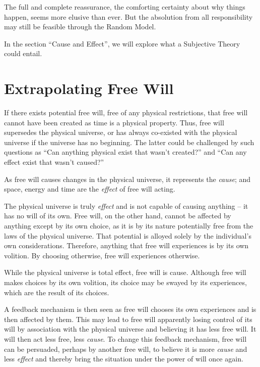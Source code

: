 \documentclass[11pt]{article}
\begin{document}
The full and complete reassurance, the comforting certainty about why things
happen, seems more elusive than ever. But the absolution from all responsibility
may still be feasible through the Random Model.

In the section ``Cause and Effect'', we will explore what a Subjective Theory
could entail.

\section{Extrapolating Free Will}

If there exists potential free will, free of any physical restrictions, that
free will cannot have been created as time is a physical property. Thus, free
will supersedes the physical universe, or has always co-existed with the
physical universe if the universe has no beginning. The latter could be
challenged by such questions as ``Can anything physical exist that wasn't
created?'' and ``Can any effect exist that wasn't caused?''

As free will causes changes in the physical universe, it represents the {\em
cause}; and space, energy and time are the {\em effect} of free will acting.

The physical universe is truly {\em effect} and is not capable of causing
anything -- it has no will of its own. Free will, on the other hand, cannot be
affected by anything except by its own choice, as it is by its nature
potentially free from the laws of the physical universe. That potential is
alloyed solely by the individual's own considerations. Therefore, anything that
free will experiences is by its own volition. By choosing otherwise, free will
experiences otherwise.

While the physical universe is total effect, free will is cause. Although free
will makes choices by its own volition, its choice may be swayed by its
experiences, which are the result of its choices. 

A feedback mechanism is then seen as free will chooses its own experiences and
is then affected by them. This may lead to free will apparently losing control
of its will by association with the physical universe and believing it has less
free will. It will then act less free, less {\em cause}. To change this feedback
mechanism, free will can be persuaded, perhaps by another free will, to believe
it is more {\em cause} and less {\em effect} and thereby bring the situation under
the power of will once again.
\end{document}
